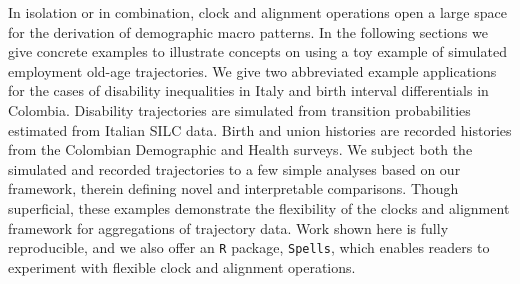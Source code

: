 \documentclass{article}
\begin{document}
In isolation or in combination, clock and alignment operations open a large space for the derivation of demographic macro patterns. In the following sections we give concrete examples to illustrate concepts on using a toy example of simulated employment old-age trajectories. We give two abbreviated example applications for the cases of disability inequalities in Italy and birth interval differentials in Colombia. Disability trajectories are simulated from transition probabilities estimated from Italian SILC data. Birth and union histories are recorded histories from the Colombian Demographic and Health surveys. We subject both the simulated and recorded trajectories to a few simple analyses based on our framework, therein defining novel and interpretable comparisons. Though superficial, these examples demonstrate the flexibility of the clocks and alignment framework for aggregations of trajectory data. Work shown here is fully reproducible, and we also offer an \texttt{R} package, \texttt{Spells}, which enables readers to experiment with flexible clock and alignment operations.
% 
\end{document}
